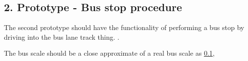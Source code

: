 \subsection{2. Prototype - Bus stop procedure}
The second prototype should have the functionality of performing a bus stop by driving into the bus lane track thing. .




The bus scale should be a close approximate of a real bus scale as \ref{}, 